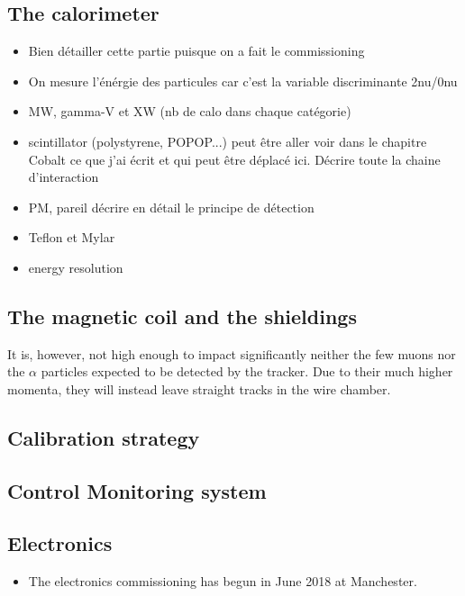 \subsection{The calorimeter}
\label{subsec:SN_calo}

\begin{itemize}
\item Bien détailler cette partie puisque on a fait le commissioning
\item On mesure l'énérgie des particules car c'est la variable discriminante 2nu/0nu
\item MW, gamma-V et XW (nb de calo dans chaque catégorie)
\item scintillator (polystyrene, POPOP...) peut être aller voir dans le chapitre Cobalt ce que j'ai écrit et qui peut être déplacé ici. Décrire toute la chaine d'interaction
\item PM, pareil décrire en détail le principe de détection
\item Teflon et Mylar
\item energy resolution
\end{itemize}

\subsection{The magnetic coil and the shieldings}

\label{sec:magnetic_field}

It is, however, not high enough to impact significantly neither the few muons nor the $\alpha$ particles expected to be detected by the tracker.
Due to their much higher momenta, they will instead leave straight tracks in the wire chamber.

\subsection{Calibration strategy}
\label{subsec:calib}

\subsection{Control Monitoring system}

\subsection{Electronics}
\begin{itemize}
\item The electronics commissioning has begun in June 2018 at Manchester.
\end{itemize}


